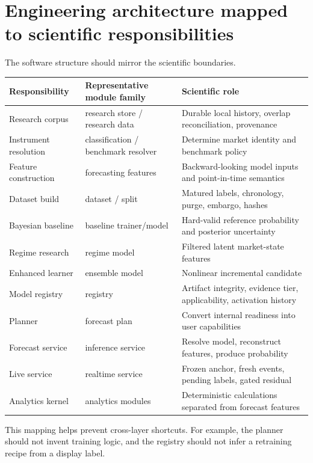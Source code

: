 \documentclass[11pt]{article}
\begin{document}
\section{Engineering architecture mapped to scientific responsibilities}
The software structure should mirror the scientific boundaries.
\begin{longtable}{p{}p{}p{}}
\toprule
Responsibility & Representative module family & Scientific role\\
\midrule
\endhead
Research corpus & research store / research data & Durable local history, overlap reconciliation, provenance\\
Instrument resolution & classification / benchmark resolver & Determine market identity and benchmark policy\\
Feature construction & forecasting features & Backward-looking model inputs and point-in-time semantics\\
Dataset build & dataset / split & Matured labels, chronology, purge, embargo, hashes\\
Bayesian baseline & baseline trainer/model & Hard-valid reference probability and posterior uncertainty\\
Regime research & regime model & Filtered latent market-state features\\
Enhanced learner & ensemble model & Nonlinear incremental candidate\\
Model registry & registry & Artifact integrity, evidence tier, applicability, activation history\\
Planner & forecast plan & Convert internal readiness into user capabilities\\
Forecast service & inference service & Resolve model, reconstruct features, produce probability\\
Live service & realtime service & Frozen anchor, fresh events, pending labels, gated residual\\
Analytics kernel & analytics modules & Deterministic calculations separated from forecast features\\
\bottomrule
\end{longtable}

This mapping helps prevent cross-layer shortcuts. For example, the planner should not invent training logic, and the registry should not infer a retraining recipe from a display label.
\end{document}
